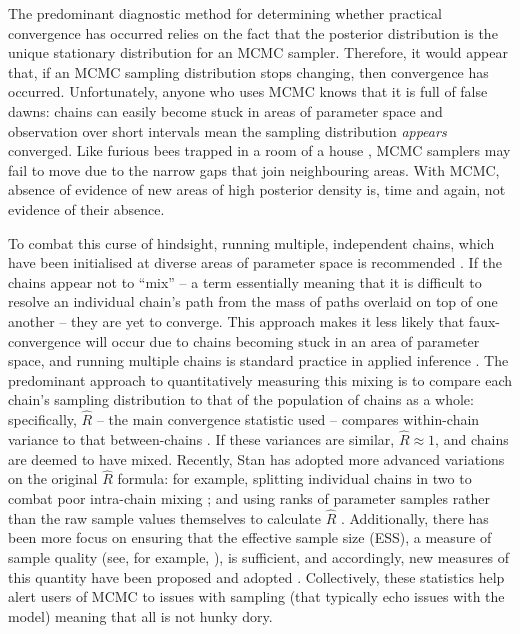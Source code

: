 \documentclass{article}
\begin{document}
The predominant diagnostic method for determining whether practical convergence has occurred relies on the fact that the posterior distribution is the unique stationary distribution for an MCMC sampler. Therefore, it would appear that, if an MCMC sampling distribution stops changing, then convergence has occurred. Unfortunately, anyone who uses MCMC knows that it is full of false dawns: chains can easily become stuck in areas of parameter space and observation over short intervals mean the sampling distribution \textit{appears} converged. Like furious bees trapped in a room of a house \cite{lambertbees}, MCMC samplers may fail to move due to the narrow gaps that join neighbouring areas. With MCMC, absence of evidence of new areas of high posterior density is, time and again, not evidence of their absence.

To combat this curse of hindsight, running multiple, independent chains, which have been initialised at diverse areas of parameter space is recommended \cite{gelman1992inference}. If the chains appear not to ``mix'' -- a term essentially meaning that it is difficult to resolve an individual chain's path from the mass of paths overlaid on top of one another -- they are yet to converge. This approach makes it less likely that faux-convergence will occur due to chains becoming stuck in an area of parameter space, and running multiple chains is standard practice in applied inference \cite{lambert2018Student}. The predominant approach to quantitatively measuring this mixing is to compare each chain's sampling distribution to that of the population of chains as a whole: specifically, $\hat{R}$ -- the main convergence statistic used -- compares within-chain variance to that between-chains \cite{gelman2013bayesian}. If these variances are similar, $\hat{R}\approx 1$, and chains are deemed to have mixed. Recently, Stan has adopted more advanced variations on the original $\hat{R}$ formula: for example, splitting individual chains in two to combat poor intra-chain mixing \cite{carpenter2017stan}; and using ranks of parameter samples rather than the raw sample values themselves to calculate $\hat{R}$ \cite{vehtari2019rank}. Additionally, there has been more focus on ensuring that the effective sample size (ESS), a measure of sample quality (see, for example, \cite{lambert2018Student}), is sufficient, and accordingly, new measures of this quantity have been proposed \cite{vehtari2019rank} and adopted \cite{carpenter2017stan}. Collectively, these statistics help alert users of MCMC to issues with sampling (that typically echo issues with the model) meaning that all is not hunky dory.
\end{document}
